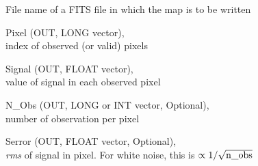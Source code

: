 \begin{qualifiers}
  \begin{qulist}{} %
 	\item[{File}]  
          name of a FITS file in which the map is to be written

 	\item[{Pixel}]  
	 (OUT, LONG vector), \\ index of observed (or valid) pixels

 	\item[{Signal}]  
	 (OUT, FLOAT vector), \\ value of signal in each observed pixel

 	\item[{N\_Obs}]  
	 (OUT, LONG or INT vector, Optional), \\ number of observation per pixel

 	\item[{Serror}]  
	 (OUT, FLOAT vector, Optional), \\{\em rms} of signal in pixel. For white noise,
                   this is $\propto 1/\sqrt{{\rm n\_obs}}$

  \end{qulist}
\end{qualifiers}

